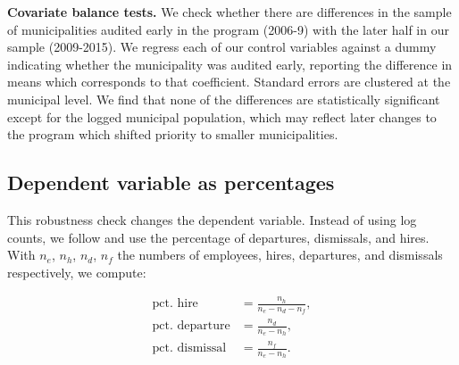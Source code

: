{%
\begin{table}[H]
    
    \caption{\textbf{Covariate balance tests.} We check whether there are differences in the sample of municipalities audited early in the program (2006-9) with the later half in our sample (2009-2015). We regress each of our control variables against a dummy indicating whether the municipality was audited early, reporting the difference in means which corresponds to that coefficient. Standard errors are clustered at the municipal level. We find that none of the differences are statistically significant except for the logged municipal population, which may reflect later changes to the program which shifted priority to smaller municipalities.}
    \label{tbl:balance}
\end{table}

\subsection{Dependent variable as percentages}
\label{app:percentageRobustness}

This robustness check changes the dependent variable. Instead of using log counts, we follow \citet{poulsen2019corruption} and use the percentage of departures, dismissals, and hires. With $n_e$, $n_h$, $n_d$, $n_f$ the numbers of employees, hires, departures, and dismissals respectively, we compute:

\begin{align*}
    \text{pct. hire} &= \frac{n_h}{n_e - n_d - n_f}, \\ 
    \text{pct. departure} &= \frac{n_d}{n_e - n_h}, \\
    \text{pct. dismissal} &= \frac{n_f}{n_e - n_h}. 
\end{align*}

}
